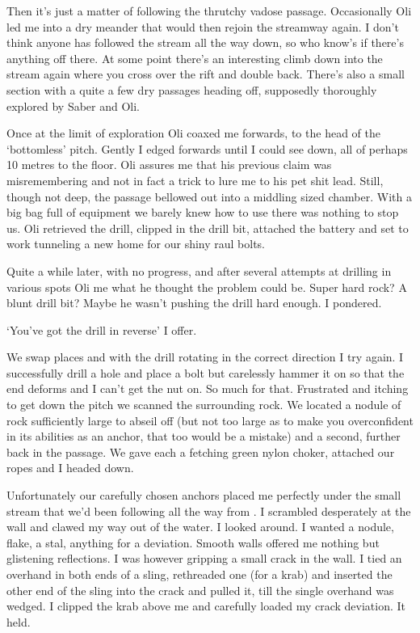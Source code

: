 Then it's  just a matter of following the thrutchy vadose passage. Occasionally Oli led me into a dry meander that would then rejoin the streamway again. I don't think anyone has followed the stream all the way down, so who know's if there's anything off there. At some point there's an interesting climb down into the stream again where you cross over the rift and double back. There's also a small section with a quite a few dry passages heading off, supposedly thoroughly explored by Saber and Oli. 
 
Once at the limit of exploration Oli coaxed me forwards, to the head of the `bottomless' pitch. Gently I edged forwards until I could see down, all of perhaps 10 metres to the floor. Oli assures me that his previous claim was misremembering and not in fact a trick to lure me to his pet shit lead. Still, though not deep, the passage bellowed out into a middling sized chamber. With a big bag full of equipment we barely knew how to use there was nothing to stop us. Oli retrieved the drill, clipped in the drill bit, attached the battery and set to work tunneling a new home for our shiny raul bolts. 
 
Quite a while later, with no progress, and after several attempts at drilling in various spots  Oli me what he thought the problem could be. Super hard rock? A blunt drill bit? Maybe he wasn't pushing the drill hard enough. I pondered. 

`You've got the drill in reverse' I offer. 

We swap places and with the drill rotating in the correct direction I try again. I successfully drill a hole and place a bolt but carelessly hammer it on so that the end deforms and I can't get the nut on. So much for that. Frustrated and itching to get down the pitch we scanned the surrounding rock. We located a nodule of rock sufficiently large to abseil off (but not too large as to make you overconfident in its abilities as an anchor, that too would be a mistake) and a second, further back in the passage. We gave each a fetching green nylon choker, attached our ropes and I headed down.
 
Unfortunately our carefully chosen anchors placed me perfectly under the small stream that we'd been following all the way from . I scrambled desperately at the wall and clawed my way out of the water. I looked around. I wanted a nodule, flake, a stal, anything for a deviation. Smooth walls offered me nothing but glistening reflections. I was however gripping a small crack in the wall. I tied an overhand in both ends of a sling, rethreaded one (for a krab) and inserted the other end of the sling into the crack and pulled it, till the single overhand was wedged. I clipped the krab above me and carefully loaded my crack deviation. It held.

